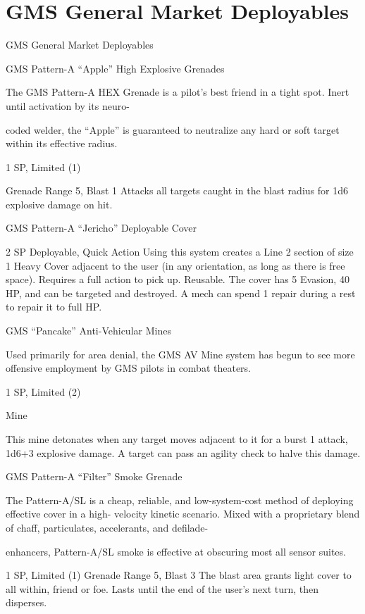 \section{GMS General Market Deployables}
                               GMS General Market Deployables   

GMS Pattern-A “Apple” High Explosive Grenades  

The GMS Pattern-A HEX Grenade is a pilot’s best friend in a tight spot. Inert until activation by its neuro- 

coded welder, the “Apple” is guaranteed to neutralize any hard or soft target within its effective radius.  
 

1 SP, Limited (1)  

Grenade  
Range 5, Blast 1  
Attacks all targets caught in the blast radius for 1d6 explosive damage on hit.
 

GMS Pattern-A “Jericho”  Deployable Cover  

2 SP  
Deployable, Quick Action  
Using this system creates a Line 2 section of size 1 Heavy Cover adjacent to the user (in any  
orientation, as long as there is free space). Requires a full action to pick up. Reusable. The cover  
has 5 Evasion, 40 HP, and can be targeted and destroyed. A mech can spend 1 repair during a  
rest to repair it to full HP.
 

GMS “Pancake” Anti-Vehicular Mines  

                                                                                                                  


Used primarily for area denial, the GMS AV Mine system has begun to see more offensive employment by  
GMS pilots in combat theaters.   

1 SP, Limited (2)
 
Mine
 
This mine detonates when any target moves adjacent to it for a burst 1 attack, 1d6+3 explosive  
damage. A target can pass an agility check to halve this damage.
 

GMS Pattern-A “Filter” Smoke Grenade  

The Pattern-A/SL is a cheap, reliable, and low-system-cost method of deploying effective cover in a high- 
velocity kinetic scenario. Mixed with a proprietary blend of chaff, particulates, accelerants, and defilade- 

enhancers, Pattern-A/SL smoke is effective at obscuring most all sensor suites.   

1 SP, Limited (1)  
Grenade  
Range 5, Blast 3  
The blast area grants light cover to all within, friend or foe. Lasts until the end of the user’s next  
turn, then disperses.